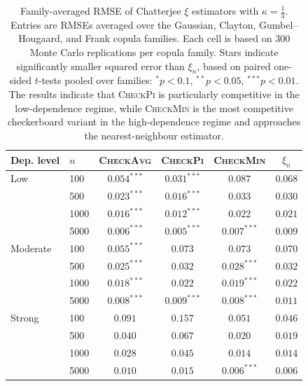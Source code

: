 \documentclass{article}
\theoremstyle{definition}
\begin{document}
\begin{table}[htbp]
  \centering
  \begin{tabular}{llcccc}
    \toprule
    Dep. level & $n$ & \textsc{CheckAvg} & \textsc{CheckPi} & \textsc{CheckMin} & $\xi_n$ \\
    \midrule
    Low & 100 & $0.054^{***}$ & $0.031^{***}$ & $0.087$ & $0.068$ \\
     & 500 & $0.023^{***}$ & $0.016^{***}$ & $0.033$ & $0.030$ \\
     & 1000 & $0.016^{***}$ & $0.012^{***}$ & $0.022$ & $0.021$ \\
     & 5000 & $0.006^{***}$ & $0.005^{***}$ & $0.007^{***}$ & $0.009$ \\
    \addlinespace[0.25em]
    \midrule
    Moderate & 100 & $0.055^{***}$ & $0.073$ & $0.073$ & $0.070$ \\
     & 500 & $0.025^{***}$ & $0.032$ & $0.028^{***}$ & $0.032$ \\
     & 1000 & $0.018^{***}$ & $0.022$ & $0.019^{***}$ & $0.022$ \\
     & 5000 & $0.008^{***}$ & $0.009^{***}$ & $0.008^{***}$ & $0.011$ \\
    \addlinespace[0.25em]
    \midrule
    Strong & 100 & $0.091$ & $0.157$ & $0.051$ & $0.046$ \\
     & 500 & $0.040$ & $0.067$ & $0.020$ & $0.019$ \\
     & 1000 & $0.028$ & $0.045$ & $0.014$ & $0.014$ \\
     & 5000 & $0.010$ & $0.015$ & $0.006^{***}$ & $0.006$ \\
    \bottomrule
  \end{tabular}
\caption{
    Family-averaged RMSE of Chatterjee \(\xi\) estimators with \(\kappa=\tfrac{1}{3}\).
    Entries are RMSEs averaged over the Gaussian, Clayton, Gumbel--Hougaard, and Frank copula families.
    Each cell is based on \(300\) Monte Carlo replications per copula family.
    Stars indicate significantly smaller squared error than \(\xi_n\), based on paired one-sided \(t\)-tests pooled over families:
    \(^{*}p<0.1\), \(^{**}p<0.05\), \(^{***}p<0.01\).
    The results indicate that \textsc{CheckPi} is particularly competitive in the low-dependence regime, while \textsc{CheckMin} is the most competitive checkerboard variant in the high-dependence regime and approaches the nearest-neighbour estimator.
}
  \label{tab:simulation_summary}
\end{table}
\end{document}
